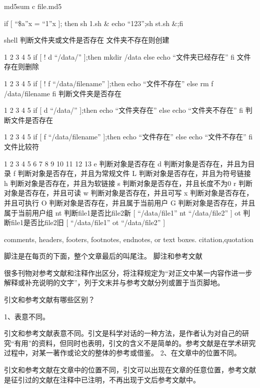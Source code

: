 \documentclass[letterpaper,12pt,english]{sphinxmanual}
\begin{document}
md5sum \sphinxhyphen{}c file.md5

if {[} “\$a”x = “1”x {]}; then sh 1.sh \& echo “123”;sh st.sh \&;fi

shell 判断文件夹或文件是否存在
文件夹不存在则创建

1
2
3
4
5
if {[} ! \sphinxhyphen{}d “/data/” {]};then
mkdir /data
else
echo “文件夹已经存在”
fi
文件存在则删除

1
2
3
4
5
if {[} ! \sphinxhyphen{}f “/data/filename” {]};then
echo “文件不存在”
else
rm \sphinxhyphen{}f /data/filename
fi
判断文件夹是否存在

1
2
3
4
5
if {[} \sphinxhyphen{}d “/data/” {]};then
echo “文件夹存在”
else
echo “文件夹不存在”
fi
判断文件是否存在

1
2
3
4
5
if {[} \sphinxhyphen{}f “/data/filename” {]};then
echo “文件存在”
else
echo “文件不存在”
fi
文件比较符

1
2
3
4
5
6
7
8
9
10
11
12
13
\sphinxhyphen{}e 判断对象是否存在
\sphinxhyphen{}d 判断对象是否存在，并且为目录
\sphinxhyphen{}f 判断对象是否存在，并且为常规文件
\sphinxhyphen{}L 判断对象是否存在，并且为符号链接
\sphinxhyphen{}h 判断对象是否存在，并且为软链接
\sphinxhyphen{}s 判断对象是否存在，并且长度不为0
\sphinxhyphen{}r 判断对象是否存在，并且可读
\sphinxhyphen{}w 判断对象是否存在，并且可写
\sphinxhyphen{}x 判断对象是否存在，并且可执行
\sphinxhyphen{}O 判断对象是否存在，并且属于当前用户
\sphinxhyphen{}G 判断对象是否存在，并且属于当前用户组
\sphinxhyphen{}nt 判断file1是否比file2新  {[} “/data/file1” \sphinxhyphen{}nt “/data/file2” {]}
\sphinxhyphen{}ot 判断file1是否比file2旧  {[} “/data/file1” \sphinxhyphen{}ot “/data/file2” {]}

comments, headers, footers, footnotes, endnotes, or text boxes.
citation,quotation

脚注是在每页的下面，整个文章最后的叫尾注。
脚注和参考文献

很多刊物对参考文献和注释作出区分，将注释规定为“对正文中某一内容作进一步解释或补充说明的文字”，列于文末并与参考文献分列或置于当页脚地。

引文和参考文献有哪些区别？

1、表意不同。

引文和参考文献表意不同。引文是科学对话的一种方法，是作者认为对自己的研究“有用”的资料，但同时也表明，引文的含义不是简单的。参考文献是在学术研究过程中，对某一著作或论文的整体的参考或借鉴。
2、在文章中的位置不同。

引文和参考文献在文章中的位置不同，引文可以出现在文章的任意位置，参考文献是征引过的文献在注释中已注明，不再出现于文后参考文献中。
\end{document}
